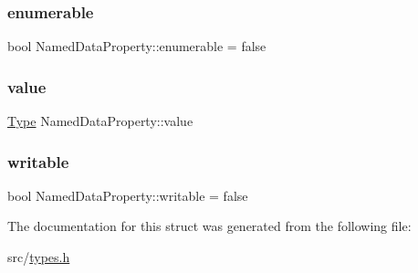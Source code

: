 \subsubsection{\texorpdfstring{enumerable}{enumerable}}
{\footnotesize\ttfamily bool Named\+Data\+Property\+::enumerable = false}

\mbox{\label{struct_named_data_property_a24c2a352d9e584c219ee0f9f6aaeb34e}} 
\subsubsection{\texorpdfstring{value}{value}}
{\footnotesize\ttfamily \hyperlink{types_8h_a053fb7bc318c12b089c5fe3ead06639d}{Type} Named\+Data\+Property\+::value}

\mbox{\label{struct_named_data_property_a83f0bc6d87115a6c14f4644eac90c3e7}} 
\subsubsection{\texorpdfstring{writable}{writable}}
{\footnotesize\ttfamily bool Named\+Data\+Property\+::writable = false}



The documentation for this struct was generated from the following file\+:\begin{DoxyCompactItemize}
\item 
src/\hyperlink{types_8h}{types.\+h}\end{DoxyCompactItemize}
